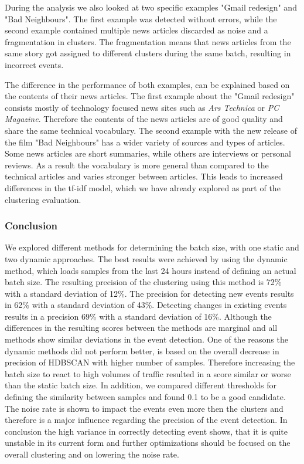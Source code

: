 During the analysis we also looked at two specific examples "Gmail redesign" and "Bad Neighbours".
The first example was detected without errors,
while the second example contained multiple news articles discarded as noise and a fragmentation in clusters.
The fragmentation means that news articles from the same story got assigned to different clusters during the same batch,
resulting in incorrect events.

The difference in the performance of both examples, can be explained based on the contents of their news articles.
The first example about the "Gmail redesign" consists mostly of technology focused news sites
such as \textit{Ars Technica} or \textit{PC Magazine}.
Therefore the contents of the news articles are of good quality and share the same technical vocabulary.
The second example with the new release of the film "Bad Neighbours"
has a wider variety of sources and types of articles.
Some news articles are short summaries, while others are interviews or personal reviews.
As a result the vocabulary is more general than compared to the technical articles and varies stronger between articles.
This leads to increased differences in the tf-idf model,
which we have already explored as part of the clustering evaluation.

\subsubsection{Conclusion}
\label{subsubsec:5b_conclusion}

We explored different methods for determining the batch size, with one static and two dynamic approaches.
The best results were achieved by using the dynamic method,
which loads samples from the last 24 hours instead of defining an actual batch size.
The resulting precision of the clustering using this method is 72\% with a standard deviation of 12\%.
The precision for detecting new events results in 62\% with a standard deviation of 43\%.
Detecting changes in existing events results in a precision 69\% with a standard deviation of 16\%.
Although the differences in the resulting scores between the methods are marginal
and all methods show similar deviations in the event detection.
One of the reasons the dynamic methods did not perform better,
is based on the overall decrease in precision of HDBSCAN with higher number of samples.
Therefore increasing the batch size to react to high volumes of traffic
resulted in a score similar or worse than the static batch size.
In addition, we compared different thresholds for defining the similarity between samples
and found 0.1 to be a good candidate.
The noise rate is shown to impact the events even more then the clusters
and therefore is a major influence regarding the precision of the event detection.
In conclusion the high variance in correctly detecting event shows,
that it is quite unstable in its current form and further optimizations should be focused
on the overall clustering and on lowering the noise rate.
